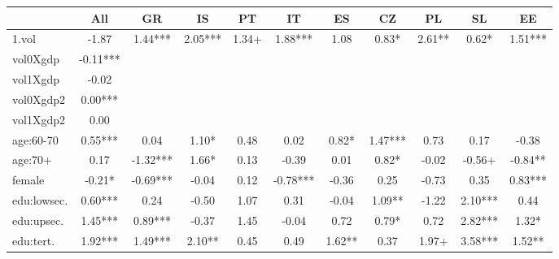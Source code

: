 {
\def\sym#1{\ifmmode^{#1}\else\(^{#1}\)\fi}
\begin{tabular}{l*{10}{c}}
\hline\hline
            &\multicolumn{1}{c}{All}&\multicolumn{1}{c}{GR}&\multicolumn{1}{c}{IS}&\multicolumn{1}{c}{PT}&\multicolumn{1}{c}{IT}&\multicolumn{1}{c}{ES}&\multicolumn{1}{c}{CZ}&\multicolumn{1}{c}{PL}&\multicolumn{1}{c}{SL}&\multicolumn{1}{c}{EE}\\
\hline
1.vol       &       -1.87   &        1.44***&        2.05***&        1.34+  &        1.88***&        1.08   &        0.83*  &        2.61** &        0.62*  &        1.51***\\
vol0Xgdp    &       -0.11***&               &               &               &               &               &               &               &               &               \\
vol1Xgdp    &       -0.02   &               &               &               &               &               &               &               &               &               \\
vol0Xgdp2   &        0.00***&               &               &               &               &               &               &               &               &               \\
vol1Xgdp2   &        0.00   &               &               &               &               &               &               &               &               &               \\
age:60-70   &        0.55***&        0.04   &        1.10*  &        0.48   &        0.02   &        0.82*  &        1.47***&        0.73   &        0.17   &       -0.38   \\
age:70+     &        0.17   &       -1.32***&        1.66*  &        0.13   &       -0.39   &        0.01   &        0.82*  &       -0.02   &       -0.56+  &       -0.84** \\
female      &       -0.21*  &       -0.69***&       -0.04   &        0.12   &       -0.78***&       -0.36   &        0.25   &       -0.73   &        0.35   &        0.83***\\
edu:lowsec. &        0.60***&        0.24   &       -0.50   &        1.07   &        0.31   &       -0.04   &        1.09** &       -1.22   &        2.10***&        0.44   \\
edu:upsec.  &        1.45***&        0.89***&       -0.37   &        1.45   &       -0.04   &        0.72   &        0.79*  &        0.72   &        2.82***&        1.32*  \\
edu:tert.   &        1.92***&        1.49***&        2.10** &        0.45   &        0.49   &        1.62** &        0.37   &        1.97+  &        3.58***&        1.52** \\

\end{tabular}}
